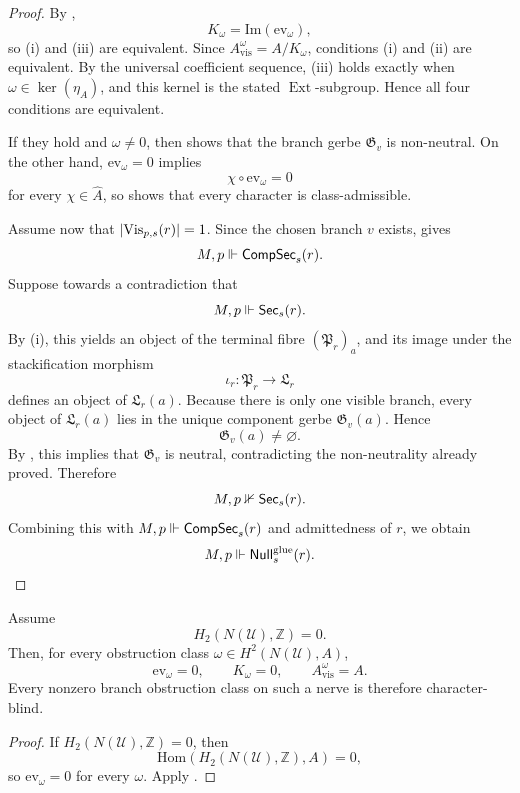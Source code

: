\begin{proof}
By ,
\[
K_{\omega}=\mathrm{Im}(\mathrm{ev}_{\omega}),
\]
so \textup{(i)} and \textup{(iii)} are equivalent. Since $A_{\mathrm{vis}}^{\omega}=A/K_{\omega}$, conditions \textup{(i)} and \textup{(ii)} are equivalent. By the universal coefficient sequence, \textup{(iii)} holds exactly when $\omega\in\ker(\eta_A)$, and this kernel is the stated $\operatorname{Ext}$-subgroup. Hence all four conditions are equivalent.

If they hold and $\omega\neq 0$, then  shows that the branch gerbe $\mathfrak G_v$ is non-neutral.
On the other hand, $\mathrm{ev}_{\omega}=0$ implies
\[
\chi\circ \mathrm{ev}_{\omega}=0
\]
for every $\chi\in\widehat A$, so  shows that every character is class-admissible.

Assume now that $|\mathrm{Vis}_{p,s}(r)|=1$. Since the chosen branch $v$ exists,  gives
\[
M,p\Vdash \mathsf{CompSec}_s(r).
\]
Suppose towards a contradiction that
\[
M,p\Vdash \mathsf{Sec}_s(r).
\]
By (i), this yields an object of the terminal fibre $(\mathfrak P_r)_a$, and its image under the stackification morphism
\[
\iota_r:\mathfrak P_r\to \mathfrak L_r
\]
defines an object of $\mathfrak L_r(a)$. Because there is only one visible branch, every object of $\mathfrak L_r(a)$ lies in the unique component gerbe $\mathfrak G_v(a)$. Hence
\[
\mathfrak G_v(a)\neq\varnothing.
\]
By , this implies that $\mathfrak G_v$ is neutral, contradicting the non-neutrality already proved. Therefore
\[
M,p\nVdash \mathsf{Sec}_s(r).
\]
Combining this with $M,p\Vdash \mathsf{CompSec}_s(r)$ and admittedness of $r$, we obtain
\[
M,p\Vdash \mathsf{Null}^{\mathrm{glue}}_s(r).
\]
\end{proof}

\begin{corollary}\label{cor:h2-vanishing-blindness}
Assume
\[
H_2(N(\mathcal U),\mathbb Z)=0.
\]
Then, for every obstruction class $\omega\in H^2(N(\mathcal U),A)$,
\[
\mathrm{ev}_{\omega}=0,
\qquad
K_{\omega}=0,
\qquad
A_{\mathrm{vis}}^{\omega}=A.
\]
Every nonzero branch obstruction class on such a nerve is therefore character-blind.
\end{corollary}

\begin{proof}
If $H_2(N(\mathcal U),\mathbb Z)=0$, then
\[
\mathrm{Hom}(H_2(N(\mathcal U),\mathbb Z),A)=0,
\]
so $\mathrm{ev}_{\omega}=0$ for every $\omega$. Apply .
\end{proof}

